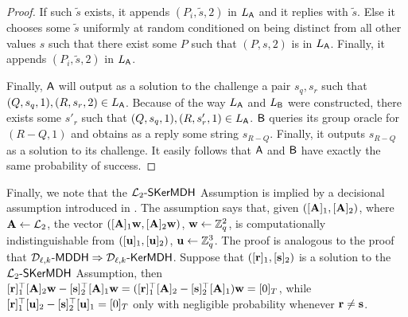 \begin{proof}
If such $\tilde{s}$ exists, it appends $(P_i, \tilde{s},2)$ in $L_{\mathsf{A}}$ and it replies with $\tilde{s}$.  Else it chooses some $\tilde{s}$ uniformly at random conditioned on being distinct from all other values $s$ such that there exist some $P$ such that $(P,s,2)$ is in $L_{\mathsf{A}}$. Finally, it appends  $(P_i, \tilde{s},2)$ in $L_{\mathsf{A}}$.  


Finally, $\mathsf{A}$ will output as a solution to the challenge a pair $s_q,s_r$ such that 
$(Q,s_q,1),(R,s_r,2) \in L_{\mathsf{A}}$. Because of the way $L_{\mathsf{A}}$ and $L_{\mathsf{B}}$ were constructed,  there exists some $s'_r$ such that $(Q,s_q,1),(R,s'_r,1) \in L_{\mathsf{A}}$. $\mathsf{B}$ queries its group oracle for $(R-Q,1)$ and obtains as a reply some string $s_{R-Q}$. Finally, it outputs $s_{R-Q}$ as a solution to its challenge. 
It easily follows that $\mathsf{A}$ and $\mathsf{B}$ have exactly the same probability of success.
\end{proof} 

Finally, we note that the $\mathcal{L}_{2}\mbox{-}\mathsf{SKerMDH}$ Assumption is implied by a decisional assumption introduced in \cite{EPRINT:LPJY15}. The assumption says that, given $([\mathbf{{A}}]_1,[\mathbf{{A}}]_2)$, where $\mathbf{{A}}\gets\mathcal{L}_2$, the vector $([\mathbf{{A}}]_1\mathbf{w},[\mathbf{{A}}]_2\mathbf{w})$, $\mathbf{w}\gets\mathbb{Z}_q^2$, is computationally indistinguishable from $([\mathbf{u}]_1,[\mathbf{u}]_2)$, $\mathbf{u}\gets\mathbb{Z}_q^3$. The proof is analogous to the proof that $\mathcal{D}_{\ell,k}\mbox{-}\mathsf{MDDH}\Rightarrow\mathcal{D}_{\ell,k}\mbox{-}\mathsf{KerMDH}$. Suppose that $([\mathbf{r}]_1,[\mathbf{s}]_2)$ is a solution to the $\mathcal{L}_2\mbox{-}\mathsf{SKerMDH}$ Assumption, then $[\mathbf{r}]_1^\top[\mathbf{{A}}]_2\mathbf{w}-[\mathbf{s}]_2^\top[\mathbf{{A}}]_1\mathbf{w}=([\mathbf{r}]_1^\top[\mathbf{{A}}]_2-[\mathbf{s}]_2^\top[\mathbf{{A}}]_1)\mathbf{w}=[0]_T$, while $[\mathbf{r}]_1^\top[\mathbf{u}]_2-[\mathbf{s}]_2^\top[\mathbf{u}]_1=[0]_T$ only with negligible probability whenever $\mathbf{r}\neq\mathbf{s}$. 
